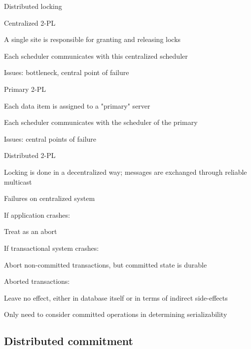 \begin{frame}{Distributed locking}

\BI
\item \alert{Centralized 2-PL}
  \BI
  \item A single site is responsible for granting and releasing locks
  \item Each scheduler communicates with this centralized scheduler
  \item Issues: bottleneck, central point of failure
  \EI
\item  \alert{Primary 2-PL}
  \BI
  \item Each data item is assigned to a "primary" server
  \item Each scheduler communicates with the scheduler of the primary
  \item Issues: central points of failure
  \EI
\item \alert{Distributed 2-PL}
  \BI
  \item Locking is done in a decentralized way; messages are exchanged through reliable multicast
  \EI
\EI
\end{frame}

\begin{frame}{Failures on centralized system}
\BI
\item If application crashes: 
 \BI 
  \item Treat as an abort 
  \EI
\item If transactional system crashes:
 \BI 
 \item Abort non-committed transactions, but committed state is durable
 \EI
\item Aborted transactions:
  \BI
  \item Leave no effect, either in database itself or in terms of indirect side-effects
  \item Only need to consider committed operations in determining serializability
  \EI
\EI
\end{frame}

\subsection{Distributed commitment}

